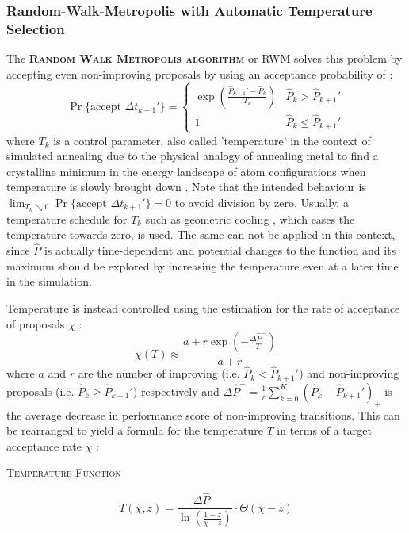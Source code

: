 \documentclass[oneside, a4paper]{book}
\newcommand\emphasis[1]{{\scshape\bfseries#1}}
\newcommand{\equationnamed}[2]{%
  \setlength{\fboxsep}{2pt} %
  \setlength{\fboxrule}{0.01pt}
  \begin{center}
    \begin{minipage}{\textwidth}
      \begin{center}\textsc{#1}\end{center}
      #2
    \end{minipage}
  \end{center}
}
\newcommand\br[1]{\left(#1\right)}
\begin{document}
    \subsubsection{Random-Walk-Metropolis with Automatic Temperature Selection}
    The \emphasis{Random Walk Metropolis algorithm} or RWM solves this problem by accepting even non-improving proposals by using an acceptance probability of \autocite{simulated-annealing}:
    \begin{equation}\label{eq:acceptance-prob}
      \Pr\{\text{accept }\Delta t_{k+1}'\} = \begin{cases}
        \exp\br{\frac{\hat{P}_{k+1}'- \hat{P}_k}{T_k}} 
        &\hat{P}_k>\hat{P}_{k+1}'\\
        1 
        &\hat{P}_k\leq\hat{P}_{k+1}'
      \end{cases}
    \end{equation}
    where $T_k$ is a control parameter, also called 'temperature' in the context of simulated annealing \autocite{simulated-annealing} due to the physical analogy of annealing metal to find a crystalline minimum in the energy landscape of atom configurations when temperature is slowly brought down \autocite{simulated-annealing}. Note that the intended behaviour is $\lim_{T_k\searrow 0} \Pr\{\text{accept }\Delta t_{k+1}'\}=0$ to avoid division by zero. Usually, a temperature schedule for $T_k$ such as geometric cooling \autocite{simulated-annealing}, which eases the temperature towards zero, is used. The same can not be applied in this context, since $\hat{P}$ is actually time-dependent and potential changes to the function and its maximum should be explored by increasing the temperature even at a later time in the simulation.
    
    Temperature is instead controlled using the estimation for the rate of acceptance of proposals $\chi$ \autocite{simulated-annealing}:
    \begin{equation}
      \chi\br{T} \approx \frac{a+r \exp\br{-\frac{\Delta\hat{P}^-}{T}}}{a+r}
    \end{equation}
    where $a$ and $r$ are the number of improving (i.e. $\hat{P}_k<\hat{P}_{k+1}'$) and non-improving proposals (i.e. $\hat{P}_k\geq\hat{P}_{k+1}'$) respectively and $\Delta \hat{P}^- = \frac{1}{r}\sum_{k=0}^K \br{\hat{P}_k - \hat{P}_{k+1}'}_+$ is the average decrease in performance score of non-improving transitions. This can be rearranged to yield a formula for the temperature $T$ in terms of a target acceptance rate $\chi$ \autocite{simulated-annealing}:
    \equationnamed{Temperature Function}{
      \begin{equation}\label{eq:c-from-chi}
        T\br{\chi,z} 
        = \frac{\Delta \hat{P}^-}{\ln\br{\frac{1-z}{\chi-z}}} \cdot \Theta\br{\chi-z}
      \end{equation}
    }
    
\end{document}
